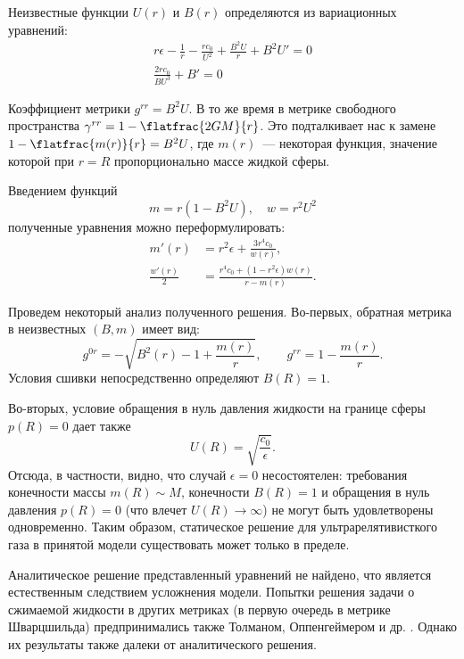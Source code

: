 \documentclass[\docroot/reports/draft/report.tex]{subfiles}
\begin{document}
    Неизвестные функции $U(r)$ и $B(r)$ определяются из вариационных уравнений:
    \begin{gather*}
        r \epsilon - \frac{1}{r} - \frac{r c_0}{U^2} + \frac{B^2 U}{r} + B^2 U' = 0 \\
        \frac{2 r c_0}{B U^3} + B' = 0
    \end{gather*}

    Коэффициент метрики $g^{rr} = B^2 U$. В то же время в метрике свободного пространства $\gamma^{rr} = 1 - \flatfrac{2 G M}{r}$. Это подталкивает нас к замене $1 - \flatfrac{m(r)}{r} = B^2 U$, где $m(r)$~--- некоторая функция, значение которой при $r = R$ пропорционально массе жидкой сферы.

    Введением функций
    \begin{equation*}
        m = r (1 - B^2 U) , \quad w = r^2 U^2
    \end{equation*}
    полученные уравнения можно переформулировать:
    \begin{align*}
        m'(r) &= r^2 \epsilon + \frac{3 r^4 c_0}{w(r)} , \\
        \frac{w'(r)}{2} &= \frac{r^4 c_0 + (1 - r^2 \epsilon) w(r)}{r - m(r)} .
    \end{align*}

    Проведем некоторый анализ полученного решения. Во-первых, обратная метрика в неизвестных $(B,m)$ имеет вид:
    \begin{equation*}
        g^{0r} = - \sqrt{B^2(r) - 1 + \frac{m(r)}{r}} , \qquad
        g^{rr} = 1 - \frac{m(r)}{r} .
    \end{equation*}
    Условия сшивки непосредственно определяют $B(R) = 1$.

    Во-вторых, условие обращения в нуль давления жидкости на границе сферы $p(R) = 0$ дает также
    \begin{equation*}
        U(R) = \sqrt{\frac{c_0}{\epsilon}} .
    \end{equation*}
    Отсюда, в частности, видно, что случай $\epsilon = 0$ несостоятелен: требования конечности массы $m(R) \sim M$, конечности $B(R) = 1$ и обращения в нуль давления $p(R) = 0$ (что влечет $U(R) \to \infty$) не могут быть удовлетворены одновременно. Таким образом, статическое решение для ультрарелятивисткого газа в принятой модели существовать может только в пределе.

    Аналитическое решение представленный уравнений не найдено, что является естественным следствием усложнения модели. Попытки решения задачи о сжимаемой жидкости в других метриках (в первую очередь в метрике Шварцшильда) предпринимались также Толманом, Оппенгеймером и др. \cite{tolman,oppenheimer_volkoff,oppenheimer_snyder}. Однако их результаты также далеки от аналитического решения.

\end{document}

